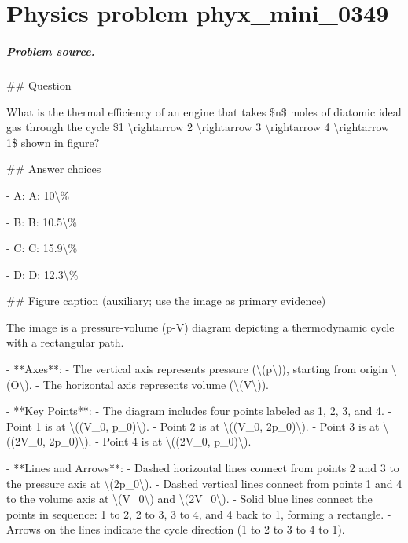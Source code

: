 
\chapter{Physics problem phyx\_mini\_0349}
\label{ch:PhyXMiniProblems_problem_phyx_mini_0349}

\paragraph{Problem source.}
\#\# Question

What is the thermal efficiency of an engine that takes \$n\$ moles of diatomic ideal gas through the cycle \$1 \textbackslash{}rightarrow 2 \textbackslash{}rightarrow 3 \textbackslash{}rightarrow 4 \textbackslash{}rightarrow 1\$ shown in figure?

\#\# Answer choices

- A: A: 10\textbackslash{}\%

- B: B: 10.5\textbackslash{}\%

- C: C: 15.9\textbackslash{}\%

- D: D: 12.3\textbackslash{}\%

\#\# Figure caption (auxiliary; use the image as primary evidence)

The image is a pressure-volume (p-V) diagram depicting a thermodynamic cycle with a rectangular path.

- **Axes**: 
  - The vertical axis represents pressure (\textbackslash{}(p\textbackslash{})), starting from origin \textbackslash{}(O\textbackslash{}).
  - The horizontal axis represents volume (\textbackslash{}(V\textbackslash{})).

- **Key Points**:
  - The diagram includes four points labeled as 1, 2, 3, and 4.
  - Point 1 is at \textbackslash{}((V\_0, p\_0)\textbackslash{}).
  - Point 2 is at \textbackslash{}((V\_0, 2p\_0)\textbackslash{}).
  - Point 3 is at \textbackslash{}((2V\_0, 2p\_0)\textbackslash{}).
  - Point 4 is at \textbackslash{}((2V\_0, p\_0)\textbackslash{}).

- **Lines and Arrows**:
  - Dashed horizontal lines connect from points 2 and 3 to the pressure axis at \textbackslash{}(2p\_0\textbackslash{}).
  - Dashed vertical lines connect from points 1 and 4 to the volume axis at \textbackslash{}(V\_0\textbackslash{}) and \textbackslash{}(2V\_0\textbackslash{}).
  - Solid blue lines connect the points in sequence: 1 to 2, 2 to 3, 3 to 4, and 4 back to 1, forming a rectangle.
  - Arrows on the lines indicate the cycle direction (1 to 2 to 3 to 4 to 1).

